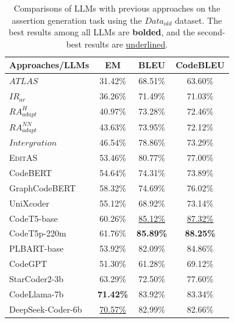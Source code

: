 \begin{table}

\centering
\footnotesize
\caption{Comparisons of LLMs with previous approaches on the assertion generation task using the $Data_{old}$ dataset. The best results among all LLMs are \textbf{bolded}, and the second-best results are \uline{underlined}.}
\label{tab:ag_comparisons_llm}
\begin{tabular}{lccc}
\toprule
\textbf{Approaches/LLMs} & \textbf{EM} & \textbf{BLEU} & \textbf{CodeBLEU} \\
\midrule
$ATLAS$ & 31.42\% & 68.51\% & 63.60\% \\
$IR_{ar}$ & 36.26\% & 71.49\% & 71.03\% \\
$RA_{adapt}^H$ & 40.97\% & 73.28\% & 72.46\% \\
$RA_{adapt}^{NN}$ & 43.63\% & 73.95\% & 72.12\% \\
$Intergration$ & 46.54\% & 78.86\% & 73.29\% \\
\textsc{EditAS} & 53.46\% & 80.77\% & 77.00\% \\
\midrule 
CodeBERT & 54.64\% & 74.31\% & 73.89\% \\
GraphCodeBERT & 58.32\% & 74.69\% & 76.02\% \\
UniXcoder & 55.12\% & 68.92\% & 73.14\% \\
CodeT5-base & 60.26\% & \uline{85.12\%} & \uline{87.32\%} \\
CodeT5p-220m & 61.76\% & \textbf{85.89\%} & \textbf{88.25\%} \\
PLBART-base & 53.92\% & 82.09\% & 84.86\% \\
CodeGPT & 51.30\% & 61.28\% & 69.12\% \\
StarCoder2-3b & 63.29\% & 72.50\% & 77.60\% \\
CodeLlama-7b & \textbf{71.42\%} & 83.92\% & 83.34\% \\
DeepSeek-Coder-6b & \uline{70.57\%} & 82.99\% & 82.66\% \\
\bottomrule
\end{tabular}


\end{table}
